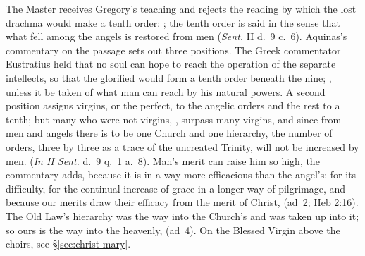 The Master receives Gregory's teaching and rejects the reading by which the
lost drachma would make a tenth order: ; the
tenth order is said  in the sense that what fell
among the angels is restored from men (\emph{Sent.} II d.~9 c.~6). Aquinas's commentary on
the passage sets out three positions. The Greek commentator Eustratius held
that no soul can hope to reach the operation of the separate intellects, so
that the glorified would form a tenth order beneath the nine; , unless it be taken of
what man can reach by his natural powers. A second position assigns virgins,
or the perfect, to the angelic orders and the rest to a tenth; but many who
were not virgins, , surpass many virgins, and
since from men and angels there is to be one Church and one hierarchy, the
number of orders, three by three as a trace of the uncreated Trinity, will
not be increased by men. 
(\emph{In II Sent.} d.~9 q.~1 a.~8). Man's merit can raise him so high, the
commentary adds, because it is in a way more efficacious than the angel's:
for its difficulty, for the continual increase of grace in a longer way of
pilgrimage, and because our merits draw their efficacy from the merit of
Christ,  (ad~2;
Heb 2:16). The Old Law's hierarchy was the way into the Church's and was
taken up into it; so ours is the way into the heavenly,  (ad~4). On the Blessed Virgin above the
choirs, see \S\ref{sec:christ-mary}.


